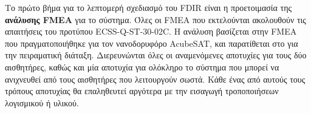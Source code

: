 \documentclass[a4paper,nobib]{tufte-book}
\begin{document}
Το πρώτο βήμα για το λεπτομερή σχεδιασμό του \ac{FDIR} είναι η προετοιμασία της \textbf{ανάλυσης FMEA} για το σύστημα. Όλες οι \ac{FMEA} που εκτελούνται ακολουθούν τις απαιτήσεις του προτύπου ECSS-Q-ST-30-02C.\autocite{ECSS-Q-ST-30-02C} Η ανάλυση βασίζεται στην \ac{FMEA} που πραγματοποιήθηκε για τον νανοδορυφόρο AcubeSAT,\autocite{retselis_acubesat_fmea_2020} και παρατίθεται στο  για την πειραματική διάταξη. Διερευνώνται όλες οι αναμενόμενες αποτυχίες για τους δύο αισθητήρες, καθώς και μία αποτυχία για ολόκληρο το σύστημα που μπορεί να ανιχνευθεί από τους αισθητήρες που λειτουργούν σωστά. Κάθε ένας από αυτούς τους τρόπους αποτυχίας θα επαληθευτεί αργότερα με την εισαγωγή τροποποιήσεων λογισμικού ή υλικού.
\end{document}
